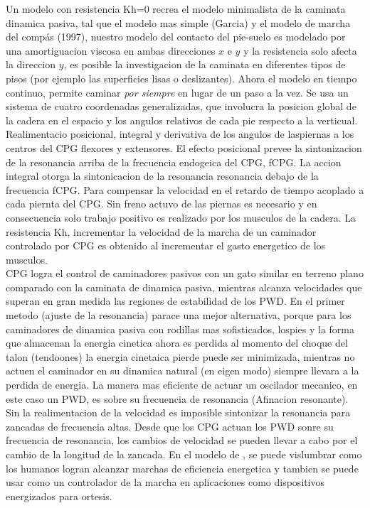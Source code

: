 \documentclass[10pt,onecolumn,twoside,letterpaper]{article}
\begin{document}
Un modelo con resistencia Kh=0 recrea el modelo minimalista de la caminata dinamica pasiva, tal que el modelo mas simple (Garcia) y el modelo de marcha del comp\'as (1997), nuestro modelo del contacto del pie-suelo es modelado por una amortiguacion viscosa en ambas direcciones $x$ e $y$ y la resistencia solo afecta la direccion $y$, es posible la investigacion de la caminata en diferentes tipos de pisos (por ejemplo las superficies lisas o deslizantes). Ahora el modelo en tiempo continuo, permite caminar \emph{por siempre} en lugar de un paso a la vez. Se usa un sistema de cuatro coordenadas generalizadas, que involucra la posicion global de la cadera en el espacio y los angulos relativos de cada pie respecto a la verticual.\cite{Verdaasdonk2009}\\
Realimentacio posicional, integral y derivativa de los angulos de laspiernas a los centros del CPG flexores y extensores. El efecto posicional prevee la sintonizacion de la resonancia arriba de la frecuencia endogeica del CPG, fCPG. La accion integral otorga la sintonicacion de la resonancia resonancia debajo de la frecuencia fCPG. Para compensar la velocidad en el retardo de tiempo acoplado a cada piernta del CPG. Sin freno actuvo de las piernas  es necesario y en consecuencia solo trabajo positivo es realizado por los musculos de la cadera. La resistencia Kh, incrementar la velocidad de la marcha de un caminador controlado por CPG es obtenido al incrementar el gasto energetico de los musculos.\cite{Verdaasdonk2009}\\
CPG logra el control de caminadores pasivos con un gato similar en terreno plano comparado con la caminata de dinamica pasiva, mientras alcanza velocidades que superan en gran medida las regiones de estabilidad de los PWD. En el primer metodo (ajuste de la resonancia) parace una mejor alternativa, porque para los caminadores de dinamica pasiva con rodillas mas sofisticados, lospies y la forma que almacenan la energia cinetica ahora es perdida al momento del choque del talon (tendoones) la energia cinetaica pierde  puede ser minimizada, mientras no actuen el caminador  en su dinamica natural (en eigen modo) siempre llevara a la perdida de energia. La manera mas eficiente de actuar un oscilador mecanico, en este caso un PWD, es sobre su frecuencia de resonancia (Afinacion resonante). Sin la realimentacion de la velocidad es imposible sintonizar la resonancia para zancadas de frecuencia altas. Desde que los CPG actuan los PWD sonre su frecuencia de resonancia, los cambios de velocidad se pueden llevar a cabo por el cambio de la longitud de la zancada. En el modelo de \cite{Verdaasdonk2009}, se puede vislumbrar como los humanos logran alcanzar marchas de eficiencia energetica y tambien se puede usar como un controlador de la marcha en aplicaciones como dispositivos energizados para ortesis.\\
\end{document}
